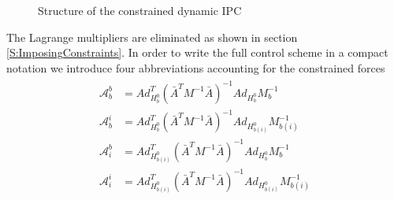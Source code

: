 \documentclass[a4paper,twoside, openright,12pt]{report}
\begin{document}
\begin{figure}[b]
	\centering
	\small
	\def\svgwidth{0.8\columnwidth}
	
	\caption{Structure of the constrained dynamic IPC}
	\label{FIG:admittancecontrol}
\end{figure}
The Lagrange multipliers are eliminated as shown in section \ref{S:ImposingConstraints}. In order to write the full control scheme in a compact notation we introduce four abbreviations accounting for the constrained forces
\begin{eqnarray}
\begin{aligned}
\mathcal{A}_b^b &= 
Ad_{H_b^0}^T(\bar{A}^TM^{-1}\bar{A})^{-1} Ad_{H_b^0}M_b^{-1} \\
\mathcal{A}_b^i &= Ad_{H_b^0}^T(\bar{A}^TM^{-1}\bar{A})^{-1} Ad_{H_{b(i)}^0}M_{b(i)}^{-1} \\
\mathcal{A}_i^b &= Ad_{H_{b(i)}^0}^T(\bar{A}^TM^{-1}\bar{A})^{-1} Ad_{H_b^0}M_b^{-1} \\
\mathcal{A}_i^i &= 
Ad_{H_{b(i)}^0}^T(\bar{A}^TM^{-1}\bar{A})^{-1} Ad_{H_{b(i)}^0}M_{b(i)}^{-1}
\end{aligned}
\end{eqnarray}
\end{document}
